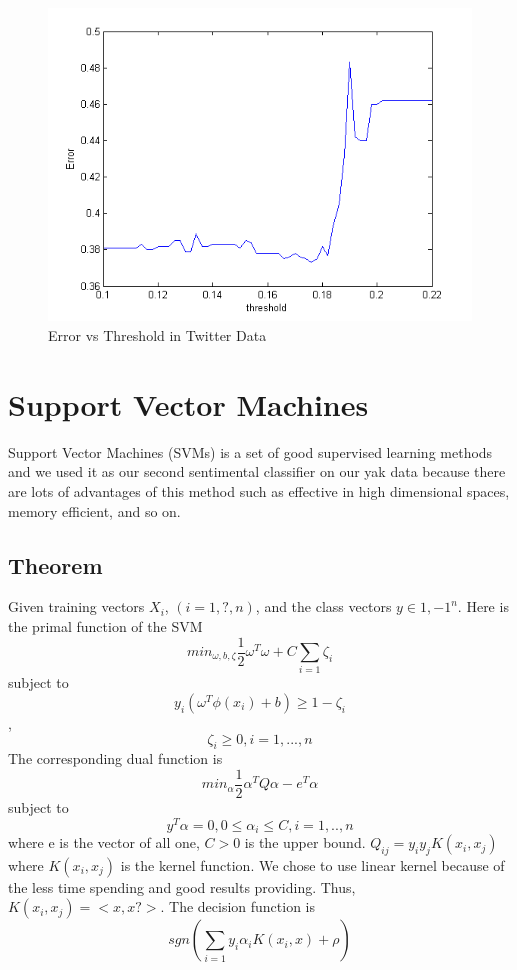 \documentclass{article}
\begin{document}
          \begin{figure}
          \centering
          \includegraphics[width=1\textwidth]{evt.png}
           \caption{Error vs Threshold in Twitter Data}
          \end{figure}
  \section{Support Vector Machines}
    Support Vector Machines (SVMs) is a set of good supervised learning methods and we used it as our second sentimental classifier on our yak data because there are lots of advantages of this method such as effective in high dimensional spaces, memory efficient, and so on. 
    \subsection{Theorem}
      Given training vectors $X_i$, $(i = 1,?,n)$, and the class vectors $y \in {1,-1}^n$.  Here is the primal function of the SVM
      $$min_{\omega,b,\zeta}\frac{1}{2}\omega^T\omega + C\sum_{i=1}\zeta_i$$ 
      subject to $$y_i(\omega^T\phi(x_i)+b)\geq 1-\zeta_i$$, $$\zeta_i \geq 0, i = 1,...,n$$
      The corresponding dual function is 
      $$min_{\alpha}\frac{1}{2}\alpha^TQ\alpha - e^T\alpha$$ subject to 
      $$y^T\alpha = 0, 0 \leq \alpha_i \leq C, i = 1, ..,n$$
      where e is the vector of all one, $C > 0$ is the upper bound. $Q_{ij} = y_i y_j K(x_i, x_j)$ where $K(x_i, x_j)$ is the kernel function. We chose to use linear kernel because of the less time spending and good results providing. Thus, $K(x_i, x_j) = <x,x?>$. The decision function is 
      $$sgn(\sum_{i=1}y_i\alpha_iK(x_i,x) + \rho)$$
\end{document}
